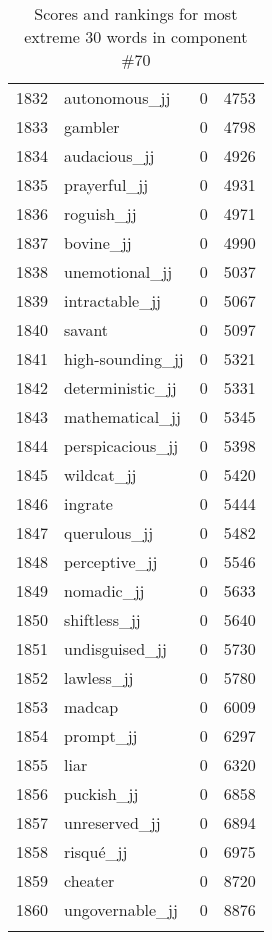 \begin{longtable}[!htbp]{| rlr@{.}l |}
    1832 & autonomous\_jj & 0 & 4753 \\
    1833 & gambler & 0 & 4798 \\
    1834 & audacious\_jj & 0 & 4926 \\
    1835 & prayerful\_jj & 0 & 4931 \\
    1836 & roguish\_jj & 0 & 4971 \\
    1837 & bovine\_jj & 0 & 4990 \\
    1838 & unemotional\_jj & 0 & 5037 \\
    1839 & intractable\_jj & 0 & 5067 \\
    1840 & savant & 0 & 5097 \\
    1841 & high-sounding\_jj & 0 & 5321 \\
    1842 & deterministic\_jj & 0 & 5331 \\
    1843 & mathematical\_jj & 0 & 5345 \\
    1844 & perspicacious\_jj & 0 & 5398 \\
    1845 & wildcat\_jj & 0 & 5420 \\
    1846 & ingrate & 0 & 5444 \\
    1847 & querulous\_jj & 0 & 5482 \\
    1848 & perceptive\_jj & 0 & 5546 \\
    1849 & nomadic\_jj & 0 & 5633 \\
    1850 & shiftless\_jj & 0 & 5640 \\
    1851 & undisguised\_jj & 0 & 5730 \\
    1852 & lawless\_jj & 0 & 5780 \\
    1853 & madcap & 0 & 6009 \\
    1854 & prompt\_jj & 0 & 6297 \\
    1855 & liar & 0 & 6320 \\
    1856 & puckish\_jj & 0 & 6858 \\
    1857 & unreserved\_jj & 0 & 6894 \\
    1858 & risqué\_jj & 0 & 6975 \\
    1859 & cheater & 0 & 8720 \\
    1860 & ungovernable\_jj & 0 & 8876 \\
    \hline
    \caption{Scores and rankings for most extreme 30 words in component \#70} \\
\end{longtable}
